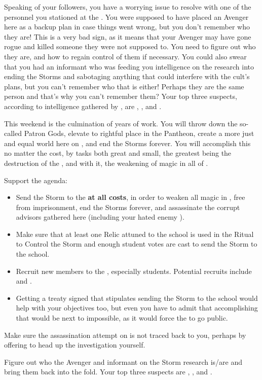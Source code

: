 \documentclass[char]{GL2020}
\begin{document}
Speaking of your followers, you have a worrying issue to resolve with one of the personnel you stationed at the \pSc{}. You were supposed to have placed an Avenger here as a backup plan in case things went wrong, but you don't remember who they are! This is a very bad sign, as it means that your Avenger may have gone rogue and killed someone they were not supposed to. You need to figure out who they are, and how to regain control of them if necessary. You could also swear that you had an informant who was feeding you intelligence on the \pTech{} research into ending the Storms and sabotaging anything that could interfere with the cult's plans, but you can't remember who that is either! Perhaps they are the same person and that's why you can't remember them? Your top three suspects, according to intelligence gathered by \cChupSecond{}, are \cInterpol{\intro}, \cChupAvenger{\intro}, and \cWildCard{\intro}.

This weekend is the culmination of years of work. You will throw down the so-called Patron Gods, elevate \cGenesis{} to \cGenesis{\their} rightful place in the Pantheon, create a more just and equal world here on \pEarth{}, and end the Storms forever. You will accomplish this no matter the cost, by tasks both great and small, the greatest being the destruction of the \pSchool{}, and with it, the weakening of magic in all of \pEarth{}.

\begin{itemz}
    \item Support the \pGoaties{} agenda:
\begin{itemize}
     \item Send the Storm to the \pSc{} \textbf{at all costs}, in order to weaken all magic in \pEarth{}, free \cGenesis{} from imprisonment, end the Storms forever, and assassinate the corrupt advisors gathered here (including your hated enemy \cJuniorStatesman{}).
     \item Make sure that at least one Relic attuned to the school is used in the Ritual to Control the Storm and enough student votes are cast to send the Storm to the school.
     \item Recruit new members to the \pGoaties{}, especially students. Potential recruits include \cInitiate{} and \cPirateChild{}.
     \item Getting a treaty signed that stipulates sending the Storm to the school would help with your objectives too, but even you have to admit that accomplishing that would be next to impossible, as it would force the \pGoaties{} to go public.
\end{itemize}
    \item Make sure the assassination attempt on \cHeadDiplomat{} is not traced back to you, perhaps by offering to head up the investigation yourself.
    \item Figure out who the Avenger and informant on the Storm research is/are and bring them back into the fold. Your top three suspects are \cInterpol{\full}, \cChupAvenger{\full}, and \cWildCard{\full}.
\end{itemz}
\end{document}
